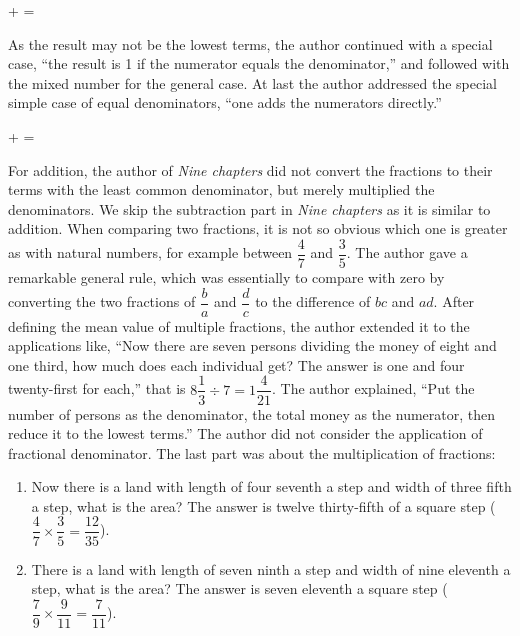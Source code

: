 \documentclass[b5paper]{article}
\begin{document}
\be
{} +  = 
\ee

As the result may not be the lowest terms, the author continued with a special case, \enquote{the result is 1 if the numerator equals the denominator,} and followed with the mixed number for the general case. At last the author addressed the special simple case of equal denominators, \enquote{one adds the numerators directly.}

\be
{} +  = 
\ee

For addition, the author of \emph{Nine chapters} did not convert the fractions to their terms with the least common denominator, but merely multiplied the denominators. We skip the subtraction part in \emph{Nine chapters} as it is similar to addition. When comparing two fractions, it is not so obvious which one is greater as with natural numbers, for example between $\dfrac{4}{7}$ and $\dfrac{3}{5}$. The author gave a remarkable general rule, which was essentially to compare with zero by converting the two fractions of $\dfrac{b}{a}$ and $\dfrac{d}{c}$ to the difference of $bc$ and $ad$. After defining the mean value of multiple fractions, the author extended it to the applications like, \enquote{Now there are seven persons dividing the money of eight and one third, how much does each individual get? The answer is one and four twenty-first for each,} that is $8\dfrac{1}{3} \div 7 = 1\dfrac{4}{21}$. The author explained, \enquote{Put the number of persons as the denominator, the total money as the numerator, then reduce it to the lowest terms.} The author did not consider the application of fractional denominator. The last part was about the multiplication of fractions:

\begin{enumerate}[1)]
\item Now there is a land with length of four seventh a step and width of three fifth a step, what is the area? The answer is twelve thirty-fifth of a square step ($\dfrac{4}{7} \times \dfrac{3}{5} = \dfrac{12}{35}$).
\item There is a land with length of seven ninth a step and width of nine eleventh a step, what is the area? The answer is seven eleventh a square step ($\dfrac{7}{9} \times \dfrac{9}{11} = \dfrac{7}{11}$).
\end{enumerate}
\end{document}
